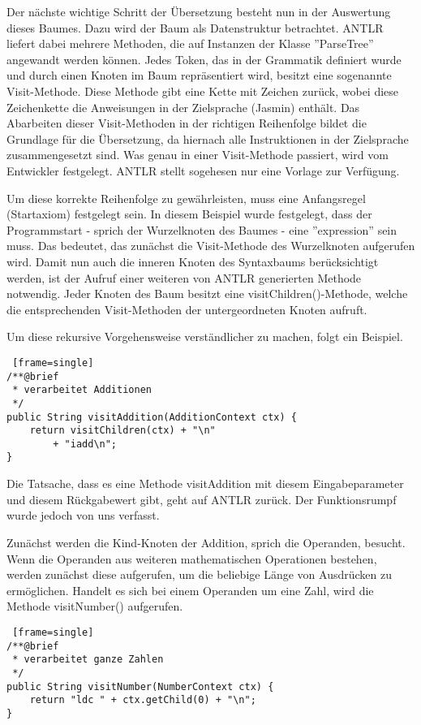 \pagebreak

Der nächste wichtige Schritt der Übersetzung besteht nun in der Auswertung dieses Baumes. Dazu wird der Baum als Datenstruktur betrachtet. ANTLR liefert dabei mehrere Methoden, die auf Instanzen der Klasse ''ParseTree'' angewandt werden können. 
Jedes Token, das in der Grammatik definiert wurde und durch einen Knoten im Baum repräsentiert wird, besitzt eine sogenannte Visit-Methode. Diese Methode gibt eine Kette mit Zeichen zurück, wobei diese Zeichenkette die Anweisungen in der Zielsprache (Jasmin) enthält. Das Abarbeiten dieser Visit-Methoden in der richtigen Reihenfolge bildet die Grundlage für die Übersetzung, da hiernach alle Instruktionen in der Zielsprache zusammengesetzt sind. Was genau in einer Visit-Methode passiert, wird vom Entwickler festgelegt. ANTLR stellt sogehesen nur eine Vorlage zur Verfügung.

Um diese korrekte Reihenfolge zu gewährleisten, muss eine Anfangsregel (Startaxiom) festgelegt sein. In diesem Beispiel wurde festgelegt, dass der Programmstart - sprich der Wurzelknoten des Baumes - eine ''expression'' sein muss. Das bedeutet, das zunächst die Visit-Methode des Wurzelknoten aufgerufen wird. Damit nun auch die inneren Knoten des Syntaxbaums berücksichtigt werden, ist der Aufruf einer weiteren von ANTLR generierten Methode notwendig. Jeder Knoten des Baum besitzt eine visitChildren()-Methode, welche die entsprechenden Visit-Methoden der untergeordneten Knoten aufruft.

\pagebreak

Um diese rekursive Vorgehensweise verständlicher zu machen, folgt ein Beispiel.


\begin{lstlisting} [frame=single]
/**@brief
 * verarbeitet Additionen
 */
public String visitAddition(AdditionContext ctx) {
	return visitChildren(ctx) + "\n"
		+ "iadd\n";
}
\end{lstlisting}
Die Tatsache, dass es eine Methode visitAddition mit diesem Eingabeparameter und diesem Rückgabewert gibt, geht auf ANTLR zurück. Der Funktionsrumpf wurde jedoch von uns verfasst.

Zunächst werden die Kind-Knoten der Addition, sprich die Operanden, besucht. Wenn die Operanden aus weiteren mathematischen Operationen bestehen, werden zunächst diese aufgerufen, um die beliebige Länge von Ausdrücken zu ermöglichen. Handelt es sich bei einem Operanden um eine Zahl, wird die Methode visitNumber() aufgerufen.

\begin{lstlisting} [frame=single]
/**@brief
 * verarbeitet ganze Zahlen
 */
public String visitNumber(NumberContext ctx) {
	return "ldc " + ctx.getChild(0) + "\n";
}
\end{lstlisting}

